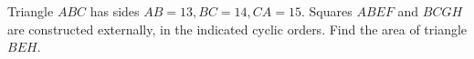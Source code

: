 Triangle $ ABC $ has sides $ AB=13,BC=14,CA=15 $. Squares $ ABEF $ and $ BCGH $ are constructed externally, in the indicated cyclic orders. Find the area of triangle $ BEH $.
